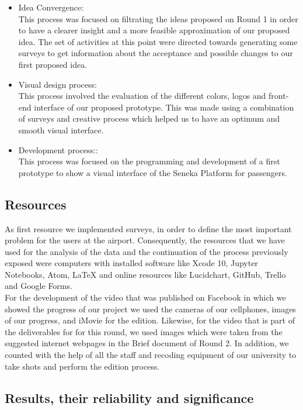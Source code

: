 \documentclass[12pt]{article}
\begin{document}
\begin{itemize}
	\item Idea Convergence:\\
	This process was focused on filtrating the ideas proposed on Round 1 in order to have a clearer insight and a more feasible approximation of our proposed idea. The 	set of activities at this point were directed towards generating some surveys to get information about the acceptance and possible changes to our first proposed idea.
	\item Visual design process:\\
	This process involved the evaluation of the different colors, logos and front-end interface of our proposed prototype. This was made using a combination of surveys 		and creative process which helped us to have an optimum and smooth visual interface.
	\item Development process::\\
	This process was focused on the programming and development of a first prototype to show a visual interface of the Seneka Platform for passengers.
\end{itemize}


\subsection{Resources}

As first resource we implemented surveys, in order to define the most important problem for the users at the airport. Consequently,  the resources that we have used for the analysis of the data and the continuation of the process previously exposed were computers with installed software like Xcode 10, Jupyter Notebooks, Atom, LaTeX and online resources like Lucidchart, GitHub, Trello and Google Forms.\\  

For the development of the video that was published on Facebook in which we showed the progress of our project we used the cameras of our cellphones, images of our progress, and iMovie for the edition. Likewise, for the video that is part of the deliverables for for this round, we used images which were taken from the suggested internet webpages in the Brief document of Round 2. In addition, we counted with the help of all the staff and recoding equipment of our university to take shots and perform the edition process.\\ 

\subsection{Results, their reliability and significance}
\end{document}
